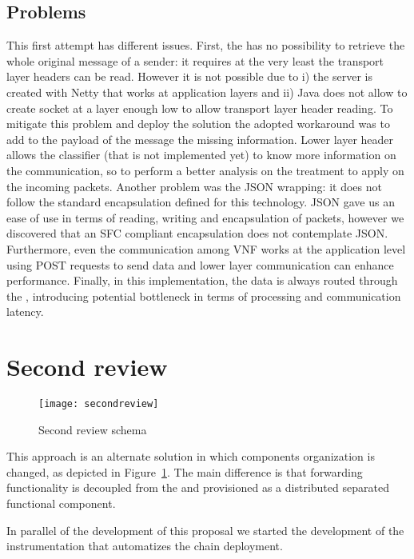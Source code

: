 \subsection{Problems}
This first attempt has different issues. First, the \enchainer{} has no
possibility to retrieve the whole original message of a sender: it requires at
the very least the transport layer headers can be read. However it is not
possible due to i) the server is created with Netty that works at application
layers and ii) Java does not allow to create socket at a layer enough low to
allow transport layer header reading. To mitigate this problem and deploy the
solution the adopted workaround was to add to the payload of the message the
missing information. Lower layer header allows the classifier (that is not
implemented yet) to know more information on the communication, so to perform a
better analysis on the treatment to apply on the incoming packets. Another
problem was the JSON wrapping: it does not follow the standard encapsulation
defined for this technology. JSON gave us an ease of use in terms of reading,
writing and encapsulation of packets, however we discovered that an SFC
compliant
encapsulation does not contemplate JSON. Furthermore, even
the communication among VNF works at the application level using POST requests
to send data and lower layer communication can enhance performance. Finally,
in this implementation, the data is always routed through the \enchainer{},
introducing potential bottleneck in terms of processing and communication
latency.

\section{Second review}
\begin{figure}
  \centering
  \texttt{[image: secondreview]}
  \caption{Second review schema}
  \label{chap:impl:img:secondreview}
\end{figure}
This approach is an alternate solution in which components
organization is changed, as depicted in Figure~\ref{chap:impl:img:secondreview}.
The main difference is that forwarding functionality is decoupled from the 
\vnfs{} and provisioned as a distributed separated functional component.

In parallel of the development of this proposal we started the development of
the instrumentation that automatizes the chain deployment.

